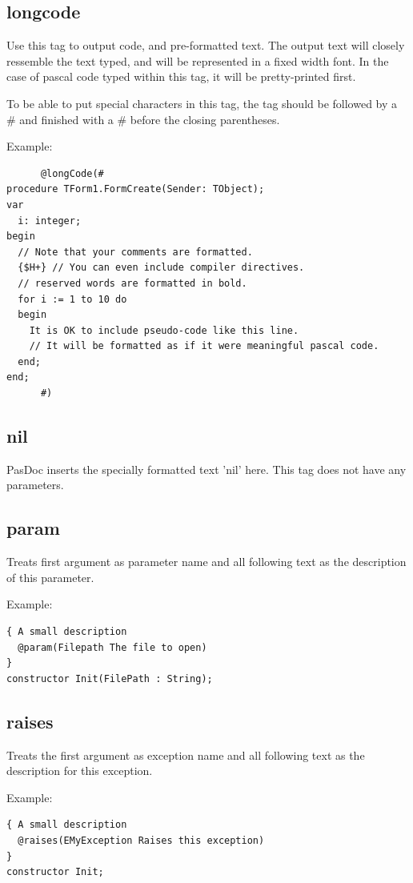 \documentclass[11pt]{article}
\begin{document}
\subsection{longcode}

Use this tag to output code, and pre-formatted text. The output
text will closely ressemble the text typed, and will be represented
in a fixed width font. In the case of pascal code typed within this
tag, it will be pretty-printed first.

To be able to put special characters in this tag, the
tag should be followed by a \# and finished with a \# before
the closing parentheses.

Example:
\begin{verbatim}
      @longCode(#
procedure TForm1.FormCreate(Sender: TObject);
var
  i: integer;
begin
  // Note that your comments are formatted.
  {$H+} // You can even include compiler directives.
  // reserved words are formatted in bold.
  for i := 1 to 10 do
  begin
    It is OK to include pseudo-code like this line.
    // It will be formatted as if it were meaningful pascal code.
  end;
end;
      #)
\end{verbatim}


\subsection{nil}

PasDoc inserts the specially formatted text 'nil' here. This tag does
not have any parameters.

\subsection{param}

Treats first argument as parameter name and all following text as the
description of this parameter.

Example:
\begin{verbatim}
{ A small description
  @param(Filepath The file to open)
}
constructor Init(FilePath : String);
\end{verbatim}


\subsection{raises}

Treats the first argument as exception name and all following
text as the description for this exception.

Example:
\begin{verbatim}
{ A small description
  @raises(EMyException Raises this exception)
}
constructor Init;
\end{verbatim}
\end{document}
